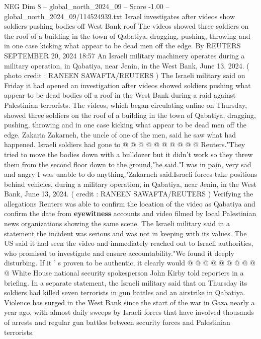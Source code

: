 \begin{textsample}{NEG Dim 8 – global\_north\_2024\_09 – Score -1.00 – global\_north\_2024\_09/114524939.txt}  \label{ex:f8_neg_373}
Israel investigates after videos show soldiers pushing bodies off West Bank roof The videos showed three soldiers on the roof of a building in the town of Qabatiya, dragging, pushing, throwing and in one case kicking what appear to be dead men off the edge.
By REUTERS SEPTEMBER 20, 2024 18:57 An Israeli military machinery operates during a military operation, in Qabatiya, near Jenin, in the West Bank, June 13, 2024. ( photo credit : RANEEN SAWAFTA/REUTERS ) The Israeli military said on Friday it had opened an investigation after videos showed soldiers pushing what appear to be dead bodies off a roof in the West Bank during a raid against Palestinian terrorists.
The videos, which began circulating online on Thursday, showed three soldiers on the roof of a building in the town of Qabatiya, dragging, pushing, throwing and in one case kicking what appear to be dead men off the edge.
Zakaria Zakarneh, the uncle of one of the men, said he saw what had happened.
Israeli soldiers had gone to @ @ @ @ @ @ @ @ @ @ Reuters."They tried to move the bodies down with a bulldozer but it didn't work so they threw them from the second floor down to the ground,"he said."I was in pain, very sad and angry I was unable to do anything,"Zakarneh said.Israeli forces take positions behind vehicles, during a military operation, in Qabatiya, near Jenin, in the West Bank, June 13, 2024. ( credit : RANEEN SAWAFTA/REUTERS ) Verifying the allegations Reuters was able to confirm the location of the video as Qabatiya and confirm the date from \textbf{eyewitness} accounts and video filmed by local Palestinian news organizations showing the same scene.
The Israeli military said in a statement the incident was serious and was not in keeping with its values.
The US said it had seen the video and immediately reached out to Israeli authorities, who promised to investigate and ensure accountability."We found it deeply disturbing.
If it ' s proven to be authentic, it clearly would @ @ @ @ @ @ @ @ @ @ White House national security spokesperson John Kirby told reporters in a briefing.
In a separate statement, the Israeli military said that on Thursday its soldiers had killed seven terrorists in gun battles and an airstrike in Qabatiya.
Violence has surged in the West Bank since the start of the war in Gaza nearly a year ago, with almost daily sweeps by Israeli forces that have involved thousands of arrests and regular gun battles between security forces and Palestinian terrorists.

\end{textsample}
